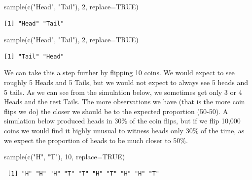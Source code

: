 \documentclass[
  letterpaper,
  DIV=11,
  numbers=noendperiod]{scrreprt}
\newenvironment{Shaded}{\begin{snugshade}}{\end{snugshade}}
\newcommand{\AttributeTok}[1]{\textcolor[rgb]{0.40,0.45,0.13}{#1}}
\newcommand{\ConstantTok}[1]{\textcolor[rgb]{0.56,0.35,0.01}{#1}}
\newcommand{\DecValTok}[1]{\textcolor[rgb]{0.68,0.00,0.00}{#1}}
\newcommand{\FunctionTok}[1]{\textcolor[rgb]{0.28,0.35,0.67}{#1}}
\newcommand{\NormalTok}[1]{\textcolor[rgb]{0.00,0.23,0.31}{#1}}
\newcommand{\StringTok}[1]{\textcolor[rgb]{0.13,0.47,0.30}{#1}}
\begin{document}
\begin{Shaded}
\begin{Highlighting}[]
\FunctionTok{sample}\NormalTok{(}\FunctionTok{c}\NormalTok{(}\StringTok{"Head"}\NormalTok{, }\StringTok{"Tail"}\NormalTok{), }\DecValTok{2}\NormalTok{, }\AttributeTok{replace=}\ConstantTok{TRUE}\NormalTok{)}
\end{Highlighting}
\end{Shaded}

\begin{verbatim}
[1] "Head" "Tail"
\end{verbatim}

\begin{Shaded}
\begin{Highlighting}[]
\FunctionTok{sample}\NormalTok{(}\FunctionTok{c}\NormalTok{(}\StringTok{"Head"}\NormalTok{, }\StringTok{"Tail"}\NormalTok{), }\DecValTok{2}\NormalTok{, }\AttributeTok{replace=}\ConstantTok{TRUE}\NormalTok{)}
\end{Highlighting}
\end{Shaded}

\begin{verbatim}
[1] "Tail" "Head"
\end{verbatim}

We can take this a step further by flipping 10 coins. We would expect to
see roughly 5 Heads and 5 Tails, but we would not expect to always see 5
heads and 5 tails. As we can see from the simulation below, we sometimes
get only 3 or 4 Heads and the rest Tails. The more observations we have
(that is the more coin flips we do) the closer we should be to the
expected proportion (50-50). A simulation below produced heads in 30\%
of the coin flips, but if we flip 10,000 coins we would find it highly
unusual to witness heads only 30\% of the time, as we expect the
proportion of heads to be much closer to 50\%.

\begin{Shaded}
\begin{Highlighting}[]
\FunctionTok{sample}\NormalTok{(}\FunctionTok{c}\NormalTok{(}\StringTok{"H"}\NormalTok{, }\StringTok{"T"}\NormalTok{), }\DecValTok{10}\NormalTok{, }\AttributeTok{replace=}\ConstantTok{TRUE}\NormalTok{)}
\end{Highlighting}
\end{Shaded}

\begin{verbatim}
 [1] "H" "H" "H" "T" "T" "H" "T" "H" "H" "T"
\end{verbatim}
\end{document}
